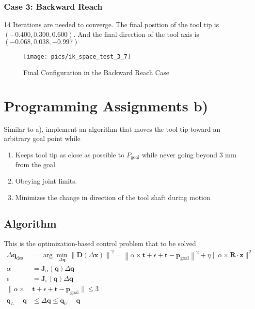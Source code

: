 \documentclass[english,10pt,a4paper]{book}
\begin{document}
		\subsubsection{Case 3: Backward Reach}
		14 Iterations are needed to converge. The final position of the tool tip is \((-0.400, 0.300, 0.600)\). And the final direction of the tool axis is \((-0.068, 0.038, -0.997)\)
		\begin{figure}[H]
			\centering
			\texttt{[image: pics/ik\_space\_test\_3\_7]}
			\caption{Final Configuration in the Backward Reach Case}
		\end{figure}
		\section{Programming Assignments b)}
		Similar to a), implement an algorithm that moves the tool tip toward an arbitrary goal point while
		\begin{enumerate}
			\item Keeps tool tip as close as possible to $P_{\text{goal}}$ while never going beyond 3 mm from the goal
			\item Obeying joint limits.
			\item Minimizes the change in direction of the tool shaft during motion
		\end{enumerate}
		\subsection{Algorithm}
		This is the optimization-based control problem that to be solved
		\begin{equation}
			\begin{aligned}
				\Delta \mathbf{q}_{\text{des}} &= \arg \min_{\Delta \mathbf{q}} \left\| \mathbf{D}(\Delta \mathbf{x}) \right\|^2 = \left\| \alpha \times \mathbf{t} + \epsilon + \mathbf{t} - \mathbf{p}_{\text{goal}} \right\|^2 + \eta \|\alpha \times \mathbf{R} \cdot \mathbf{z}\|^2\\
				\alpha &= \mathbf{J}_{\alpha}(\mathbf{q}) \Delta \mathbf{q} \\
				\epsilon &= \mathbf{J}_{\epsilon}(\mathbf{q}) \Delta \mathbf{q} \\
				\| \alpha \times &\mathbf{t} + \epsilon + \mathbf{t} - \mathbf{p}_{\text{goal}} \| \leq 3 \\
				\mathbf{q}_L - \mathbf{q} &\leq \Delta \mathbf{q} \leq \mathbf{q}_U - \mathbf{q}
			\end{aligned}
		\end{equation}
		
\end{document}
